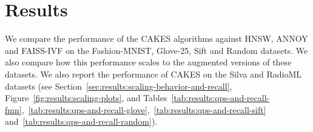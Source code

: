 \section{Results}
\label{sec:results}


We compare the performance of the CAKES algorithms against HNSW, ANNOY and FAISS-IVF on the Fashion-MNIST, Glove-25, Sift and Random datasets.
We also compare how this performance scales to the augmented versions of these datasets.
We also report the performance of CAKES on the Silva and RadioML datasets (see Section~\ref{sec:results:scaling-behavior-and-recall}, Figure~\ref{fig:results:scaling-plots}, and Tables~\ref{tab:results:qps-and-recall-fmn},~\ref{tab:results:qps-and-recall-glove},~\ref{tab:results:qps-and-recall-sift} and~\ref{tab:results:qps-and-recall-random}).






